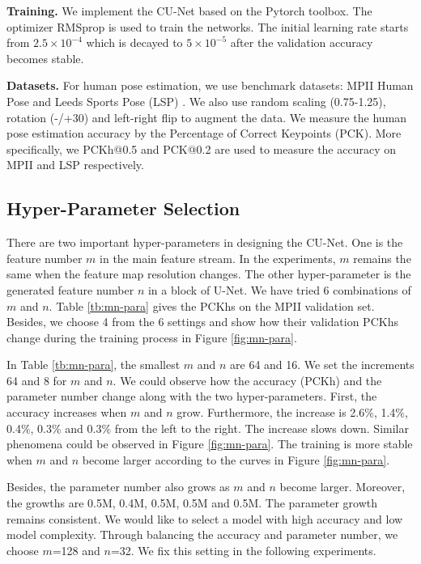 \documentclass{bmvc2k}
\begin{document}
{\bf Training.} We implement the CU-Net based on the Pytorch toolbox. The optimizer RMSprop is used to train the networks. The initial learning rate starts from $2.5\times 10^{-4}$ which is decayed to $5\times 10^{-5}$ after the validation accuracy becomes stable.

{\bf Datasets.} For human pose estimation, we use benchmark datasets: MPII Human Pose \cite{andriluka14cvpr} and Leeds Sports Pose (LSP) \cite{johnson2010lsp}. We also use random scaling (0.75-1.25), rotation (-/+30) and left-right flip to augment the data. We measure the human pose estimation accuracy by the Percentage of Correct Keypoints (PCK). More specifically, we PCKh@0.5 and PCK@0.2 are used to measure the accuracy on MPII and LSP respectively.

\subsection{Hyper-Parameter Selection}
There are two important hyper-parameters in designing the CU-Net. One is the feature number $m$ in the main feature stream. In the experiments, $m$ remains the same when the feature map resolution changes. The other hyper-parameter is the generated feature number $n$ in a block of U-Net. We have tried 6 combinations of $m$ and $n$. Table \ref{tb:mn-para} gives the PCKhs on the MPII validation set. Besides, we choose 4 from the 6 settings and show how their validation PCKhs change during the training process in Figure \ref{fig:mn-para}.

In Table \ref{tb:mn-para}, the smallest $m$ and $n$ are 64 and 16. We set the increments 64 and 8 for $m$ and $n$. We could observe how the accuracy (PCKh) and the parameter number change along with the two hyper-parameters. First, the accuracy increases when $m$ and $n$ grow. Furthermore, the increase is 2.6\%, 1.4\%, 0.4\%, 0.3\% and 0.3\% from the left to the right. The increase slows down. Similar phenomena could be observed in Figure \ref{fig:mn-para}. The training is more stable when $m$ and $n$ become larger according to the curves in Figure \ref{fig:mn-para}.

Besides, the parameter number also grows as $m$ and $n$ become larger. Moreover, the growths are 0.5M, 0.4M, 0.5M, 0.5M and 0.5M. The parameter growth remains consistent. We would like to select a model with high accuracy and low model complexity. Through balancing the accuracy and parameter number, we choose $m$=128 and $n$=32. We fix this setting in the following experiments.
\end{document}
